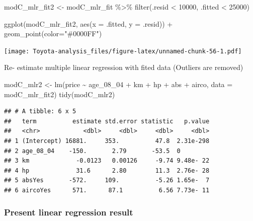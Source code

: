 \documentclass[
]{article}
\newenvironment{Shaded}{\begin{snugshade}}{\end{snugshade}}
\newcommand{\AttributeTok}[1]{\textcolor[rgb]{0.77,0.63,0.00}{#1}}
\newcommand{\DecValTok}[1]{\textcolor[rgb]{0.00,0.00,0.81}{#1}}
\newcommand{\FunctionTok}[1]{\textcolor[rgb]{0.00,0.00,0.00}{#1}}
\newcommand{\NormalTok}[1]{#1}
\newcommand{\OtherTok}[1]{\textcolor[rgb]{0.56,0.35,0.01}{#1}}
\newcommand{\SpecialCharTok}[1]{\textcolor[rgb]{0.00,0.00,0.00}{#1}}
\newcommand{\StringTok}[1]{\textcolor[rgb]{0.31,0.60,0.02}{#1}}
\begin{document}
\begin{Shaded}
\begin{Highlighting}[]
\NormalTok{modC\_mlr\_fit2 }\OtherTok{\textless{}{-}}\NormalTok{ modC\_mlr\_fit }\SpecialCharTok{\%\textgreater{}\%} 
  \FunctionTok{filter}\NormalTok{(.resid }\SpecialCharTok{\textless{}} \DecValTok{10000}\NormalTok{,}
\NormalTok{         .fitted }\SpecialCharTok{\textless{}} \DecValTok{25000}\NormalTok{) }

\FunctionTok{ggplot}\NormalTok{(modC\_mlr\_fit2, }\FunctionTok{aes}\NormalTok{(}\AttributeTok{x =}\NormalTok{ .fitted, }\AttributeTok{y =}\NormalTok{ .resid)) }\SpecialCharTok{+}
  \FunctionTok{geom\_point}\NormalTok{(}\AttributeTok{color=}\StringTok{"\#0000FF"}\NormalTok{)}
\end{Highlighting}
\end{Shaded}

\texttt{[image: Toyota-analysis\_files/figure-latex/unnamed-chunk-56-1.pdf]}

Re- estimate multiple linear regression with fited data (Outliers are
removed)

\begin{Shaded}
\begin{Highlighting}[]
\NormalTok{modC\_mlr2 }\OtherTok{\textless{}{-}} \FunctionTok{lm}\NormalTok{(price }\SpecialCharTok{\textasciitilde{}}\NormalTok{ age\_08\_04 }\SpecialCharTok{+}\NormalTok{ km }\SpecialCharTok{+}\NormalTok{ hp }\SpecialCharTok{+}
\NormalTok{                 abs }\SpecialCharTok{+}\NormalTok{ airco, }\AttributeTok{data =}\NormalTok{ modC\_mlr\_fit2)}
\FunctionTok{tidy}\NormalTok{(modC\_mlr2)}
\end{Highlighting}
\end{Shaded}

\begin{verbatim}
## # A tibble: 6 x 5
##   term          estimate std.error statistic   p.value
##   <chr>            <dbl>     <dbl>     <dbl>     <dbl>
## 1 (Intercept) 16881.     353.          47.8  2.31e-298
## 2 age_08_04    -150.       2.79       -53.5  0        
## 3 km             -0.0123   0.00126     -9.74 9.48e- 22
## 4 hp             31.6      2.80        11.3  2.76e- 28
## 5 absYes       -572.     109.          -5.26 1.65e-  7
## 6 aircoYes      571.      87.1          6.56 7.73e- 11
\end{verbatim}

\hypertarget{present-linear-regression-result}{%
\subsubsection{Present linear regression
result}\label{present-linear-regression-result}}
\end{document}
